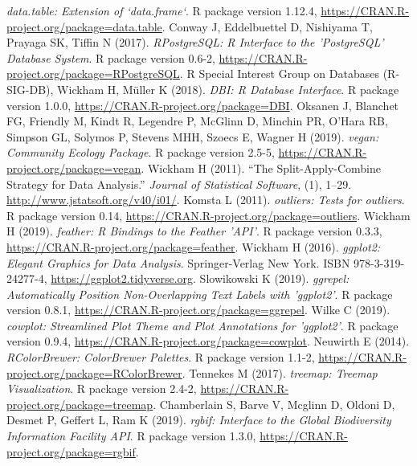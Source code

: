 \emph{data.table: Extension of `data.frame`}.
R package version 1.12.4, \url{https://CRAN.R-project.org/package=data.table}.
\newline Conway J, Eddelbuettel D, Nishiyama T, Prayaga SK, Tiffin N (2017).
\emph{RPostgreSQL: R Interface to the 'PostgreSQL' Database System}.
R package version 0.6-2, \url{https://CRAN.R-project.org/package=RPostgreSQL}.
\newline R Special Interest Group on Databases (R-SIG-DB), Wickham H, Müller K (2018).
\emph{DBI: R Database Interface}.
R package version 1.0.0, \url{https://CRAN.R-project.org/package=DBI}.
\newline Oksanen J, Blanchet FG, Friendly M, Kindt R, Legendre P, McGlinn D, Minchin PR, O'Hara RB, Simpson GL, Solymos P, Stevens MHH, Szoecs E, Wagner H (2019).
\emph{vegan: Community Ecology Package}.
R package version 2.5-5, \url{https://CRAN.R-project.org/package=vegan}.
\newline Wickham H (2011).
``The Split-Apply-Combine Strategy for Data Analysis.''
\emph{Journal of Statistical Software}, (1), 1--29.
\url{http://www.jstatsoft.org/v40/i01/}.
\newline Komsta L (2011).
\emph{outliers: Tests for outliers}.
R package version 0.14, \url{https://CRAN.R-project.org/package=outliers}.
\newline Wickham H (2019).
\emph{feather: R Bindings to the Feather 'API'}.
R package version 0.3.3, \url{https://CRAN.R-project.org/package=feather}.
\newline Wickham H (2016).
\emph{ggplot2: Elegant Graphics for Data Analysis}.
Springer-Verlag New York.
ISBN 978-3-319-24277-4, \url{https://ggplot2.tidyverse.org}.
\newline Slowikowski K (2019).
\emph{ggrepel: Automatically Position Non-Overlapping Text Labels with
'ggplot2'}.
R package version 0.8.1, \url{https://CRAN.R-project.org/package=ggrepel}.
\newline Wilke C (2019).
\emph{cowplot: Streamlined Plot Theme and Plot Annotations for 'ggplot2'}.
R package version 0.9.4, \url{https://CRAN.R-project.org/package=cowplot}.
\newline Neuwirth E (2014).
\emph{RColorBrewer: ColorBrewer Palettes}.
R package version 1.1-2, \url{https://CRAN.R-project.org/package=RColorBrewer}.
\newline Tennekes M (2017).
\emph{treemap: Treemap Visualization}.
R package version 2.4-2, \url{https://CRAN.R-project.org/package=treemap}.
\newline Chamberlain S, Barve V, Mcglinn D, Oldoni D, Desmet P, Geffert L, Ram K (2019).
\emph{rgbif: Interface to the Global Biodiversity Information Facility API}.
R package version 1.3.0, \url{https://CRAN.R-project.org/package=rgbif}.


